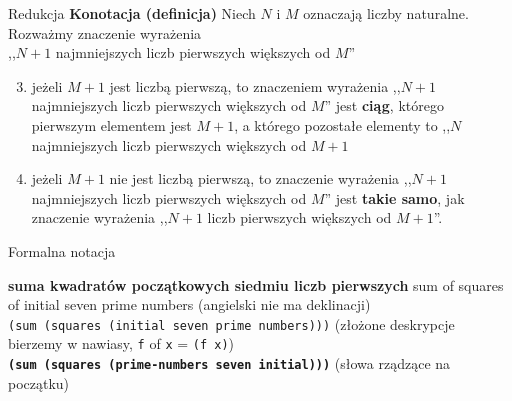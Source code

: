 \documentclass{beamer}
\begin{document}
\begin{frame}{Redukcja}
  \textbf{Konotacja (definicja)} 
  Niech $N$ i $M$ oznaczają liczby naturalne. Rozważmy znaczenie wyrażenia \\
  ,,$N+1$ najmniejszych liczb pierwszych większych od $M$'' \pause \\

  \begin{enumerate}
    \setcounter{enumi}{2}
    \item jeżeli $M+1$ jest liczbą pierwszą, to znaczeniem wyrażenia
    ,,$N+1$ najmniejszych liczb pierwszych większych od $M$'' jest \textbf{ciąg},
    którego pierwszym elementem jest $M+1$, a którego pozostałe elementy
    to ,,$N$ najmniejszych liczb pierwszych większych od $M+1$ \pause
    
  \item jeżeli $M+1$ nie jest liczbą pierwszą, to znaczenie wyrażenia
    ,,$N+1$ najmniejszych liczb pierwszych większych od $M$'' jest
    \textbf{takie samo}, jak znaczenie wyrażenia ,,$N+1$ liczb pierwszych
    większych od $M+1$''.
  \end{enumerate}
\end{frame}

\begin{frame}
\end{frame}

\begin{frame}{Formalna notacja}

  \textbf{suma kwadratów początkowych siedmiu liczb pierwszych}
  \pause
  sum of squares of initial seven prime numbers 
  {\tiny (angielski nie ma deklinacji)} \\
  \pause
  \texttt{(sum (squares (initial seven prime numbers)))} {\tiny(złożone
    deskrypcje bierzemy w nawiasy, \texttt{f} of \texttt{x} = \texttt{(f x)})} \\
  \pause
  \textbf{\texttt{(sum (squares (prime-numbers seven initial)))}}
  {\tiny(słowa rządzące na początku)} \\

\end{frame}


\end{document}
